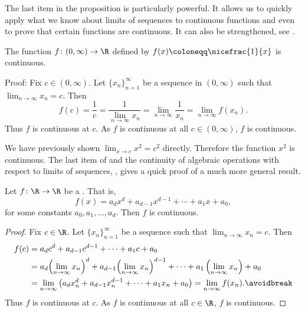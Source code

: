 The last item in the proposition is particularly powerful.  It allows us to
quickly apply what we know about limits of sequences to continuous functions
and even to prove that certain functions are continuous.
It can also be strengthened, see .

\begin{example}
The function $f \colon (0,\infty) \to \R$
defined by $f(x) \coloneqq \nicefrac{1}{x}$ is continuous.

Proof: Fix $c \in (0,\infty)$.  
Let $\{ x_n \}_{n=1}^\infty$ be a sequence in $(0,\infty)$ such that
$\lim_{n\to\infty} x_n = c$.  Then
\begin{equation*}
f(c) = \frac{1}{c}
=
\frac{1}{\lim_{n\to\infty} x_n}
=
\lim_{n \to \infty} \frac{1}{x_n}
=
\lim_{n \to \infty} f(x_n) .
\end{equation*}
Thus $f$ is continuous at $c$.  As $f$ is continuous at all $c \in
(0,\infty)$, $f$ is continuous.
\end{example}

We have previously shown $\lim_{x \to c} x^2 = c^2$ directly.  Therefore
the function $x^2$ is continuous.  The last item of  and the continuity of
algebraic operations with respect to limits of sequences,
, gives a quick proof of a much more general result.

\begin{prop}
Let $f \colon \R \to \R$ be a \emph{}.  That is,
\begin{equation*}
f(x) = a_d x^d + a_{d-1} x^{d-1} + \cdots + a_1 x + a_0 ,
\end{equation*}
for some constants $a_0, a_1, \ldots, a_d$.
Then $f$ is continuous.
\end{prop}

\begin{proof}
Fix $c \in \R$.  
Let $\{ x_n \}_{n=1}^\infty$ be a sequence such that
$\lim_{n\to\infty} x_n = c$.  Then
\begin{equation*}
\begin{split}
f(c) &=
a_d c^d + a_{d-1} c^{d-1} + \cdots + a_1 c + a_0 
\\
&= 
a_d {\left(\lim_{n\to\infty} x_n\right)}^d
+ a_{d-1} {\left(\lim_{n\to\infty} x_n\right)}^{d-1}
+ \cdots
+ a_1 \left(\lim_{n\to\infty} x_n\right) + a_0 
\\
& =
\lim_{n \to \infty}
\left(
a_d x_n^d + a_{d-1} x_n^{d-1} + \cdots + a_1 x_n + a_0 
\right)
=
\lim_{n \to \infty}
f(x_n) .
\avoidbreak
\end{split}
\end{equation*}
Thus $f$ is continuous at $c$.  As $f$ is continuous at all $c \in \R$,
$f$ is continuous.
\end{proof}

